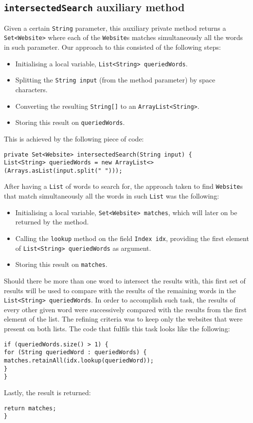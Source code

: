 \subsection{{\tt intersectedSearch} auxiliary method}
Given a certain {\tt String} parameter, this auxiliary private method returns a {\tt Set<Website>} where each of the {\tt Website}s matches simultaneously all the words in such parameter. Our approach to this consisted of the following steps:
\begin{itemize}
\item Initialising a local variable, {\tt List<String> queriedWords}.
\item Splitting the {\tt String input} (from the method parameter) by space characters.
\item Converting the resulting {\tt String[]} to an {\tt ArrayList<String>}.
\item Storing this result on {\tt queriedWords}.
\end{itemize}
This is achieved by the following piece of code:
\begin{lstlisting}
private Set<Website> intersectedSearch(String input) {
List<String> queriedWords = new ArrayList<>(Arrays.asList(input.split(" ")));
\end{lstlisting}
After having a {\tt List} of words to search for, the approach taken to find {\tt Website}s that match simultaneously all the words in such {\tt List} was the following:
\begin{itemize}
\item Initialising a local variable, {\tt Set<Website> matches}, which will later on be returned by the method.
\item Calling the {\tt lookup} method on the field {\tt Index idx}, providing the first element of {\tt List<String> queriedWords} as argument.
\item Storing this result on {\tt matches}.
\end{itemize}
Should there be more than one word to intersect the results with, this first set of results will be used to compare with the results of the remaining words in the {\tt List<String> queriedWords}. In order to accomplish such task, the results of every other given word were successively compared with the results from the first element of the list. The refining criteria was to keep only the websites that were present on both lists. The code that fulfils this task looks like the following:
\begin{lstlisting}
if (queriedWords.size() > 1) {
for (String queriedWord : queriedWords) {
matches.retainAll(idx.lookup(queriedWord));
}
}
\end{lstlisting}
Lastly, the result is returned:
\begin{lstlisting}
return matches;
}
\end{lstlisting}
